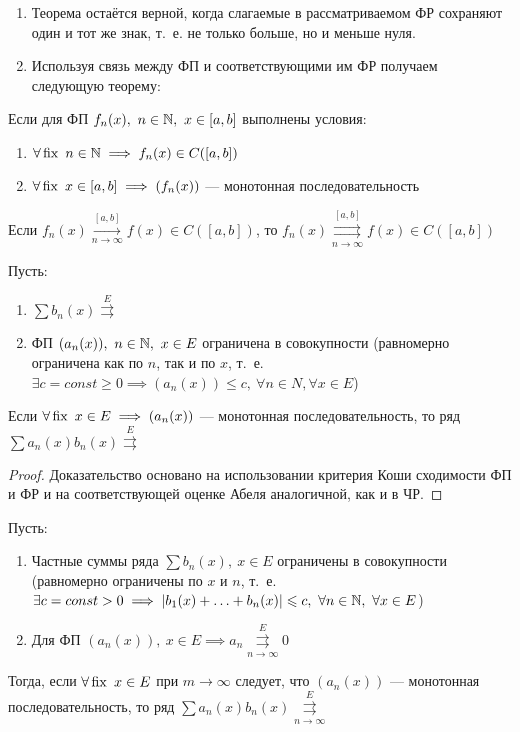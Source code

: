 \documentclass[../../main.tex]{subfiles}
\begin{document}
\begin{rem}
	\;
	
	\begin{enumerate}
		\item Теорема остаётся верной, когда слагаемые в рассматриваемом ФР
	сохраняют один и тот же знак, т.~е. не только больше, но и меньше нуля.
		\item Используя связь между ФП и соответствующими им ФР получаем
	следующую теорему:
	\end{enumerate}
\end{rem}	
\begin{thm}
Если для ФП $f_n(x),\ n \in \mathbb{N},\ x \in [a,b]$ выполнены условия:
	\begin{enumerate}
		\item $\forall \operatorname{fix} \ n \in \mathbb{N} \implies
		f_n(x) \in C([a,b])$
		\item $\forall \operatorname{fix} \ x \in [a,b] \implies
		(f_n(x))$ --- монотонная последовательность 
	\end{enumerate}			
Если $f_n(x) \overset{[a,b]}
{\underset{n \to \infty}\longrightarrow} f(x) \in C([a,b])$, то
$f_n(x) \overset{[a,b]}
{\underset{n \to \infty}\rightrightarrows} f(x) \in C([a,b])$
\end{thm}  

\begin{thm}
Пусть:
\begin{enumerate}
	\item $\sum b_n(x) \overset{E}{\rightrightarrows}$
	\item ФП $(a_n(x)),\ n \in \mathbb{N},\ x \in E$ ограничена 
в совокупности (равномерно ограничена как по $n$, так и по $x$, т.~е.
$\exists c = const \geq 0 \implies (a_n(x)) \leq c,\ 
\forall n \in N, \forall x \in E$)
\end{enumerate}
Если $\forall \operatorname{fix} \ x \in E \implies (a_n(x))$ --- монотонная 
последовательность, то ряд $\sum a_n(x)b_n(x) \overset{E}{\rightrightarrows}$
\end{thm}	

\begin{proof}
Доказательство основано на использовании критерия Коши сходимости ФП и ФР и
на соответствующей оценке Абеля аналогичной, как и в ЧР.	
\end{proof}

\begin{thm}
Пусть:
\begin{enumerate}
	\item Частные суммы ряда $\sum b_n(x),\ x \in E$ 
ограничены в совокупности (равномерно ограничены по $x$ и $n$, 
т.~е. $\exists c = const > 0 \implies |b_1(x) + \ldots + b_n(x)| \leqslant c,\
\forall n \in \mathbb{N},\ \forall x \in E$)
	\item Для ФП $(a_n(x)),\ x \in E \implies a_n 
\overset{E}
{\underset{n \to \infty}\rightrightarrows} 0$
\end{enumerate}
Тогда, если $\forall \operatorname{fix} \ x \in E$ при $m \to \infty$ следует, 
что $(a_n(x))$ --- монотонная последовательность, 
то ряд $\sum a_n(x)b_n(x) \overset{E}
{\underset{n \to \infty}\rightrightarrows}$
\end{thm}
\end{document}
